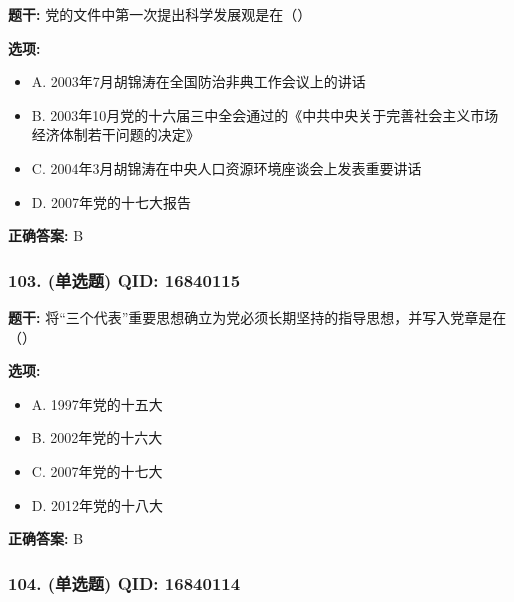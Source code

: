 \documentclass[12pt,UTF8]{ctexart}
\begin{document}
\textbf{题干:}
党的文件中第一次提出科学发展观是在（）

\textbf{选项:}
\begin{itemize}[leftmargin=*]

  \item A. 2003年7月胡锦涛在全国防治非典工作会议上的讲话

  \item B. 2003年10月党的十六届三中全会通过的《中共中央关于完善社会主义市场经济体制若干问题的决定》

  \item C. 2004年3月胡锦涛在中央人口资源环境座谈会上发表重要讲话

  \item D. 2007年党的十七大报告

\end{itemize}

\textbf{正确答案:}
B

\vspace{0.3em}\hrulefill\vspace{0.7em}

\subsubsection*{103. (单选题) \small QID: 16840115}

\textbf{题干:}
将“三个代表”重要思想确立为党必须长期坚持的指导思想，并写入党章是在（）

\textbf{选项:}
\begin{itemize}[leftmargin=*]

  \item A. 1997年党的十五大

  \item B. 2002年党的十六大

  \item C. 2007年党的十七大

  \item D. 2012年党的十八大

\end{itemize}

\textbf{正确答案:}
B

\vspace{0.3em}\hrulefill\vspace{0.7em}

\subsubsection*{104. (单选题) \small QID: 16840114}
\end{document}
